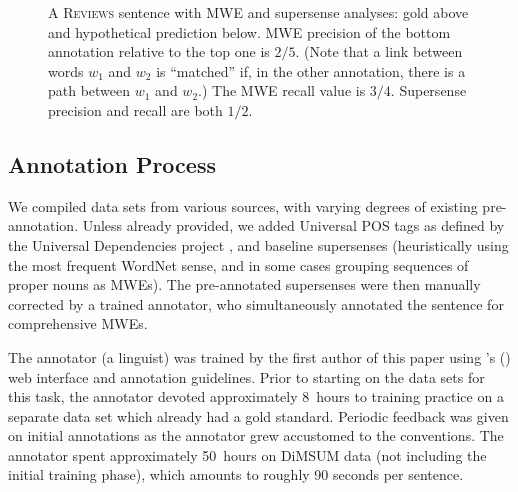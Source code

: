 \documentclass[11pt,letterpaper]{article}
\makeatletter
\newcommand{\citeposs}[1]{\citeauthor{#1}'s (\citeyear{#1})}
\newcommand{\sst}[1]{\textsc{#1}} %
\newcommand{\tagtss}[5]{\begin{tabular}{@{\hspace{2pt}}c@{\hspace{2pt}}} \texttt{#2\vphantom{\textlarger{Ĩ}}}\\ \sst{#3}\vphantom{X} \\ \textbf{#1}\vphantom{lp} \\ \sst{#5}\vphantom{X} \\ \texttt{#4\vphantom{\textlarger{Ĩ}}}\end{tabular}}
\makeatother
\begin{document}
\begin{figure}
\caption{A \textsc{Reviews} sentence with MWE and supersense analyses: gold above and hypothetical prediction below. 
MWE precision of the bottom annotation relative to the top one is $2/5$. %
(Note that a link between words $w_1$ and $w_2$ is ``matched'' 
if, in the other annotation, there is a path between $w_1$ and $w_2$.) 
The MWE recall value is $3/4$. 
Supersense precision and recall are both $1/2$.
}
\label{fig:linkmeasure}
\end{figure}

\subsection{Annotation Process}
We compiled data sets from various sources, with varying degrees of existing pre-annotation. 
Unless already provided, we added Universal POS tags as defined by the Universal Dependencies project \citep{nivre-15}, 
and baseline supersenses (heuristically using the most frequent WordNet sense, and
in some cases grouping sequences of proper nouns as MWEs). %
The pre-annotated supersenses were then manually corrected by a trained annotator, 
who simultaneously annotated the sentence for comprehensive MWEs. 

The annotator (a linguist) was trained by the first author of this paper  
using \citeposs{schneider-15} web interface and annotation guidelines.
Prior to starting on the data sets for this task,
the annotator devoted approximately 8~hours to training practice 
on a separate data set which already had a gold standard.
Periodic feedback was given on initial annotations as the annotator grew accustomed to the conventions.
The annotator spent approximately 50~hours on DiMSUM data (not including the initial training phase), 
which amounts to roughly 90 seconds per sentence. 
\end{document}
